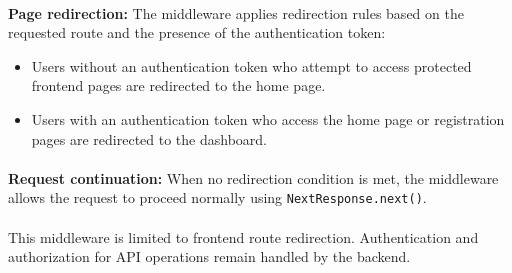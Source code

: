\paragraph{}\textbf{Page redirection:}
The middleware applies redirection rules based on the requested route and the presence of the authentication token:
\begin{itemize}
\item Users without an authentication token who attempt to access protected frontend pages are redirected to the home page.
\item Users with an authentication token who access the home page or registration pages are redirected to the dashboard.
\end{itemize}

\paragraph{}\textbf{Request continuation:}
When no redirection condition is met, the middleware allows the request to proceed normally using \texttt{NextResponse.next()}.

\paragraph{}This middleware is limited to frontend route redirection. Authentication and authorization for API operations remain handled by the backend.
